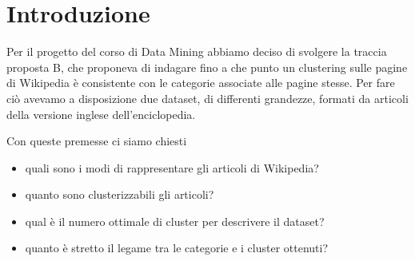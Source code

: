 \documentclass[
	11pt, %
	a4paper, %
	oneside, %
	headinclude,footinclude, %
	BCOR5mm, %
]{scrartcl}
\title{\normalfont\spacedallcaps{Suggested Project Goal B}} %
\author{
  Cazzaro Davide\\
  \texttt{1138635}
  \and
  Dalla Cia Massimo\\
  \texttt{1153092}
  \and
  Lovisotto Enrico\\
  \texttt{1156704}
  \and
  Vianello Enrico\\
  \texttt{1153101}
}
\date{} %
\begin{document}

\renewcommand{\sectionmark}[1]{\markright{\spacedlowsmallcaps{#1}}} %
\lehead{\mbox{\llap{\small\thepage\kern1em\color{halfgray} \vline}\color{halfgray}\hspace{0.5em}\rightmark\hfil}} %

\pagestyle{scrheadings} %


\maketitle %



\section{Introduzione}
Per il progetto del corso di Data Mining abbiamo deciso di svolgere la traccia proposta B, che proponeva di indagare fino a che punto un clustering sulle pagine di Wikipedia è consistente con le categorie associate alle pagine stesse.
Per fare ciò avevamo a disposizione due dataset, di differenti grandezze, formati da articoli della versione inglese dell'enciclopedia.

Con queste premesse ci siamo chiesti
\begin{itemize}
	\item quali sono i modi di rappresentare gli articoli di Wikipedia?
	\item quanto sono clusterizzabili gli articoli?
	\item qual è il numero ottimale di cluster per descrivere il dataset?
	\item quanto è stretto il legame tra le categorie e i cluster ottenuti?
\end{itemize}
\end{document}
